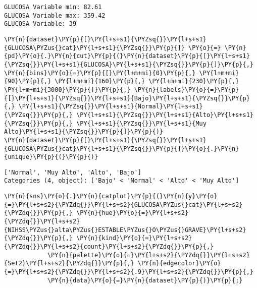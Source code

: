     \begin{Verbatim}[commandchars=\\\{\}]
GLUCOSA Variable min: 82.61
GLUCOSA Variable max: 359.42
GLUCOSA Variable: 39
    \end{Verbatim}

    \begin{tcolorbox}[breakable, size=fbox, boxrule=1pt, pad at break*=1mm,colback=cellbackground, colframe=cellborder]
\begin{Verbatim}[commandchars=\\\{\}]
\PY{n}{dataset}\PY{p}{[}\PY{l+s+s1}{\PYZsq{}}\PY{l+s+s1}{GLUCOSA\PYZus{}cat}\PY{l+s+s1}{\PYZsq{}}\PY{p}{]} \PY{o}{=} \PY{n}{pd}\PY{o}{.}\PY{n}{cut}\PY{p}{(}\PY{n}{dataset}\PY{p}{[}\PY{l+s+s1}{\PYZsq{}}\PY{l+s+s1}{GLUCOSA}\PY{l+s+s1}{\PYZsq{}}\PY{p}{]}\PY{p}{,} \PY{n}{bins}\PY{o}{=}\PY{p}{[}\PY{l+m+mi}{0}\PY{p}{,} \PY{l+m+mi}{90}\PY{p}{,} \PY{l+m+mi}{160}\PY{p}{,} \PY{l+m+mi}{230}\PY{p}{,} \PY{l+m+mi}{3000}\PY{p}{]}\PY{p}{,} \PY{n}{labels}\PY{o}{=}\PY{p}{[}\PY{l+s+s1}{\PYZsq{}}\PY{l+s+s1}{Bajo}\PY{l+s+s1}{\PYZsq{}}\PY{p}{,} \PY{l+s+s1}{\PYZsq{}}\PY{l+s+s1}{Normal}\PY{l+s+s1}{\PYZsq{}}\PY{p}{,} \PY{l+s+s1}{\PYZsq{}}\PY{l+s+s1}{Alto}\PY{l+s+s1}{\PYZsq{}}\PY{p}{,} \PY{l+s+s1}{\PYZsq{}}\PY{l+s+s1}{Muy Alto}\PY{l+s+s1}{\PYZsq{}}\PY{p}{]}\PY{p}{)}
\PY{n}{dataset}\PY{p}{[}\PY{l+s+s1}{\PYZsq{}}\PY{l+s+s1}{GLUCOSA\PYZus{}cat}\PY{l+s+s1}{\PYZsq{}}\PY{p}{]}\PY{o}{.}\PY{n}{unique}\PY{p}{(}\PY{p}{)}
\end{Verbatim}
\end{tcolorbox}

            \begin{tcolorbox}[breakable, size=fbox, boxrule=.5pt, pad at break*=1mm, opacityfill=0]
\begin{Verbatim}[commandchars=\\\{\}]
['Normal', 'Muy Alto', 'Alto', 'Bajo']
Categories (4, object): ['Bajo' < 'Normal' < 'Alto' < 'Muy Alto']
\end{Verbatim}
\end{tcolorbox}
        
    \begin{tcolorbox}[breakable, size=fbox, boxrule=1pt, pad at break*=1mm,colback=cellbackground, colframe=cellborder]
\begin{Verbatim}[commandchars=\\\{\}]
\PY{n}{sns}\PY{o}{.}\PY{n}{catplot}\PY{p}{(}\PY{n}{y}\PY{o}{=}\PY{l+s+s2}{\PYZdq{}}\PY{l+s+s2}{GLUCOSA\PYZus{}cat}\PY{l+s+s2}{\PYZdq{}}\PY{p}{,} \PY{n}{hue}\PY{o}{=}\PY{l+s+s2}{\PYZdq{}}\PY{l+s+s2}{NIHSS\PYZus{}alta\PYZus{}ESTABLE\PYZus{}O\PYZus{}GRAVE}\PY{l+s+s2}{\PYZdq{}}\PY{p}{,} \PY{n}{kind}\PY{o}{=}\PY{l+s+s2}{\PYZdq{}}\PY{l+s+s2}{count}\PY{l+s+s2}{\PYZdq{}}\PY{p}{,}
            \PY{n}{palette}\PY{o}{=}\PY{l+s+s2}{\PYZdq{}}\PY{l+s+s2}{Set2}\PY{l+s+s2}{\PYZdq{}}\PY{p}{,} \PY{n}{edgecolor}\PY{o}{=}\PY{l+s+s2}{\PYZdq{}}\PY{l+s+s2}{.9}\PY{l+s+s2}{\PYZdq{}}\PY{p}{,}
            \PY{n}{data}\PY{o}{=}\PY{n}{dataset}\PY{p}{)}\PY{p}{;}
\end{Verbatim}
\end{tcolorbox}

